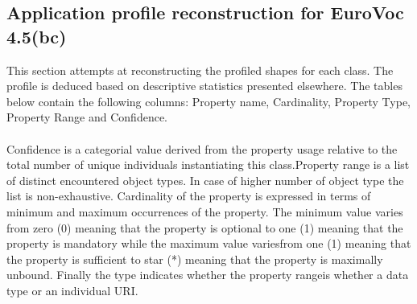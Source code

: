 \documentclass[10pt,a4paper,titlepage,final]{article}
\begin{document}
\subsection{Application profile reconstruction for EuroVoc 4.5(bc)}
This section attempts at reconstructing the profiled shapes for each class. The profile is deduced based on descriptive statistics presented elsewhere. The tables below contain the following columns: Property name, Cardinality, Property Type, Property Range and Confidence. \\\\ Confidence is a categorial value derived from the property usage relative to the total number of unique individuals instantiating this class.Property range is a list of distinct encountered object types. In case of higher number of object type the list is non{-}exhaustive. Cardinality of the property is expressed in terms of minimum and maximum occurrences of the property. The minimum value varies from zero (0) meaning that the property is optional to one (1) meaning that the property is mandatory while the maximum value variesfrom one (1) meaning that the property is sufficient to star (*) meaning that the property is maximally unbound. Finally the type indicates whether the property rangeis whether a data type or an individual URI.
\end{document}
